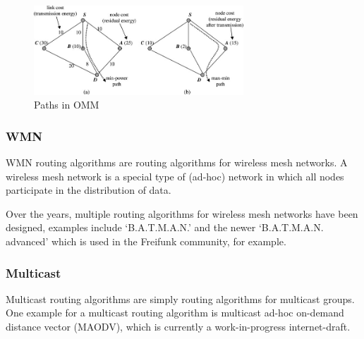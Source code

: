 \begin{figure}
\centering
\includegraphics[width=0.7\textwidth]{images/omm}
\caption{Paths in OMM\cite{alotaibi2012survey}}
\label{ommex}
\end{figure}
\subsubsection*{WMN}
WMN routing algorithms are routing algorithms for wireless mesh networks.
A wireless mesh network is a special type of (ad-hoc) network in which all
nodes participate in the distribution of data.

Over the years, multiple routing algorithms for wireless mesh networks have
been designed, examples include `B.A.T.M.A.N.' and the newer `B.A.T.M.A.N. advanced'
which is used in the Freifunk community, for example\cite{batman-adv}.

\subsubsection*{Multicast}
Multicast routing algorithms are simply routing algorithms for multicast
groups.
One example for a multicast routing algorithm is multicast ad-hoc on-demand
distance vector (MAODV)\cite{manet-maodv-00}, which is currently a
work-in-progress internet-draft.
